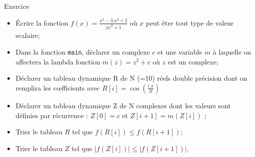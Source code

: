 \documentclass[compress,10pt,aspectratio=169]{beamer}
\begin{document}
\begin{frame}[fragile]{Exercice}
  \scriptsize 

\begin{itemize}
\item \'Ecrire la fonction $f(x)=\frac{x^{3}-3.x^{2}+2}{|x|^{2} + 1}$ où $x$ peut être tout type de valeur scalaire;
\item Dans la fonction \texttt{main}, déclarer un complexe $c$ et une variable $m$
      à laquelle on affectera la lambda fonction $m(z)=z^{2}+c$ où $z$ est un complexe;
\item Déclarer un tableau dynamique R de N (=10) réels double précision dont on remplira 
      les c{\oe}fficients avec $R[i] = \cos(\frac{i.\pi}{N})$ 
\item Déclarer un tableau dynamique Z de N complexes dont les valeurs sont définies par récurrence :
      $Z[0] = c$ et $Z[i+1] = m(Z[i])$ ;
\item Trier le tableau $R$ tel que $f(R[i]) \leq f(R[i+1])$;
\item Trier le tableau $Z$ tel que $|f(Z[i])| \leq |f(Z[i+1])|$.     
\end{itemize}
\end{frame}
\end{document}
